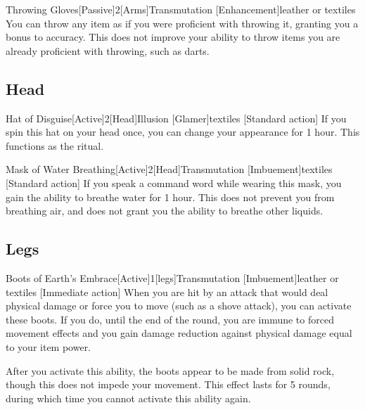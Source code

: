         \begin{magicitemdef}{Throwing Gloves}[Passive]{2}[Arms]{Transmutation [Enhancement]}{leather or textiles}
             You can throw any item as if you were proficient with throwing it, granting you a  bonus to accuracy.
            This does not improve your ability to throw items you are already proficient with throwing, such as darts.
        \end{magicitemdef}

    \subsection{Head}

        \begin{magicitemdef}{Hat of Disguise}[Active]{2}[Head]{Illusion [Glamer]}{textiles}
            [Standard action] If you spin this hat on your head once, you can change your appearance for 1 hour.
            This functions as the  ritual.
        \end{magicitemdef}

        \begin{magicitemdef}{Mask of Water Breathing}[Active]{2}[Head]{Transmutation [Imbuement]}{textiles}
            [Standard action] If you speak a command word while wearing this mask, you gain the ability to breathe water for 1 hour.
            This does not prevent you from breathing air, and does not grant you the ability to breathe other liquids.
        \end{magicitemdef}

    \subsection{Legs}

        \begin{magicitemdef}{Boots of Earth's Embrace}[Active]{1}[legs]{Transmutation [Imbuement]}{leather or textiles}
            [Immediate action] When you are hit by an attack that would deal physical damage or force you to move (such as a shove attack), you can activate these boots.
            If you do, until the end of the round, you are immune to forced movement effects and you gain damage reduction against physical damage equal to your item power.

            After you activate this ability, the boots appear to be made from solid rock, though this does not impede your movement.
            This effect lasts for 5 rounds, during which time you cannot activate this ability again.
        \end{magicitemdef}

